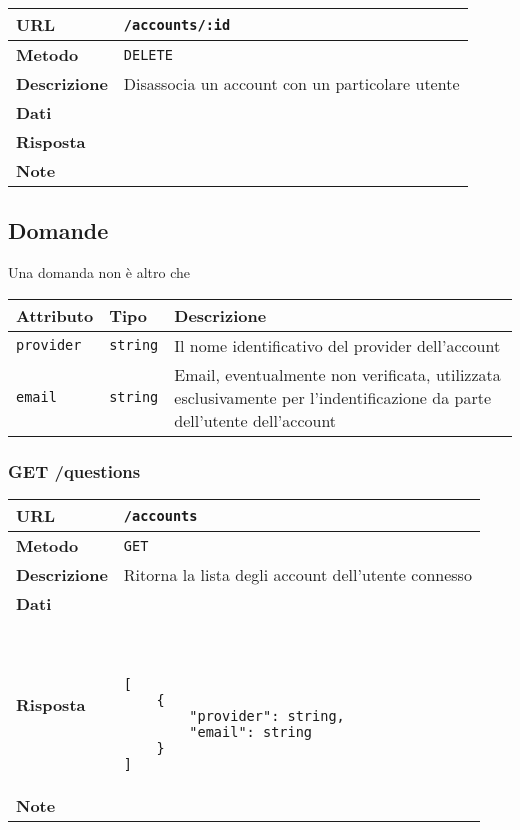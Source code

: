 \documentclass[12pt,a4paper]{article}
\begin{document}
            \begin{tabular}{|l|l|} 
                \hline
                \textbf{URL} & \texttt{/accounts/:id} \\ \hline
                \textbf{Metodo} & \texttt{DELETE} \\ \hline
                \textbf{Descrizione} & 
                    Disassocia un account con un particolare utente \\ \hline
                \textbf{Dati} & \\ \hline
                \textbf{Risposta} & \\ \hline
                \textbf{Note} & \\ \hline
            \end{tabular}

	\subsection{Domande}

		\par Una domanda non è altro che  

        \begin{center}
            \begin{tabular}{ | l | l | l | } 
            \hline
                Attributo & Tipo & Descrizione \\
            \hline
                \texttt{provider} & \texttt{string} & 
                    Il nome identificativo del provider dell'account \\
                \texttt{email} & \texttt{string} & 
                    Email, eventualmente non verificata, utilizzata esclusivamente
                    per l'indentificazione da parte dell'utente dell'account \\
            \hline
            \end{tabular}
        \end{center}

        \subsubsection{GET /questions}

            \begin{tabular}{|l|l|} 
                \hline
                \textbf{URL} & \texttt{/accounts} \\ \hline
                \textbf{Metodo} & \texttt{GET} \\ \hline
                \textbf{Descrizione} & 
                    Ritorna la lista degli account dell'utente connesso \\ \hline
                \textbf{Dati} & \\ \hline
                \textbf{Risposta} & \
                    \begin{lstlisting}[basicstyle={\ttfamily}]
[
    {
        "provider": string,
        "email": string
    }
]
                    \end{lstlisting} \\ \hline
                \textbf{Note} & \\ \hline
            \end{tabular}
\end{document}
